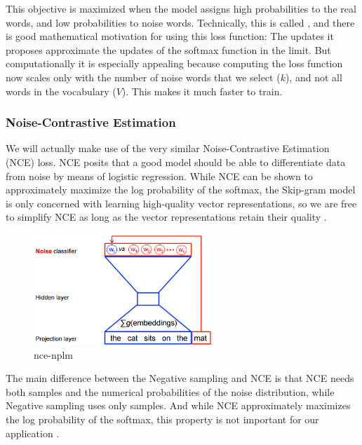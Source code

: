  This objective is maximized when the model assigns high probabilities to the real words, and low probabilities to noise words. Technically, this is called \textcite{ Negative Sampling}, and there is good mathematical motivation for using this loss function: The updates it proposes approximate the updates of the softmax function in the limit. But computationally it is especially appealing because computing the loss function now scales only with the number of noise words that we select ($k$), and not all words in the vocabulary ($V$). This makes it much faster to train.
 
\subsubsection{Noise-Contrastive Estimation}

We will actually make use of the very similar Noise-Contrastive Estimation (NCE) loss. NCE posits that a good model should be able to differentiate data from noise by means of logistic regression. While NCE can be shown to approximately maximize the log probability of the softmax, the Skip-gram model is only concerned with learning high-quality vector representations, so we are free to simplify NCE as long as the vector representations retain their quality \cite{DBLP:journals/corr/MikolovSCCD13}.

\begin{figure}[H]%
    \center%
    \includegraphics[width=0.6\textwidth]{images/amira/nce-nplm.png}%
    \caption[Negative Sampling Graph]{nce-nplm}\label{fig:nce-nplm}%
\end{figure}

The main difference between the Negative sampling and NCE is that NCE needs both
samples and the numerical probabilities of the noise distribution, while Negative sampling uses only samples. And while NCE approximately maximizes the log probability of the softmax, this property is not important for our application \cite{DBLP:journals/corr/MikolovSCCD13}.
